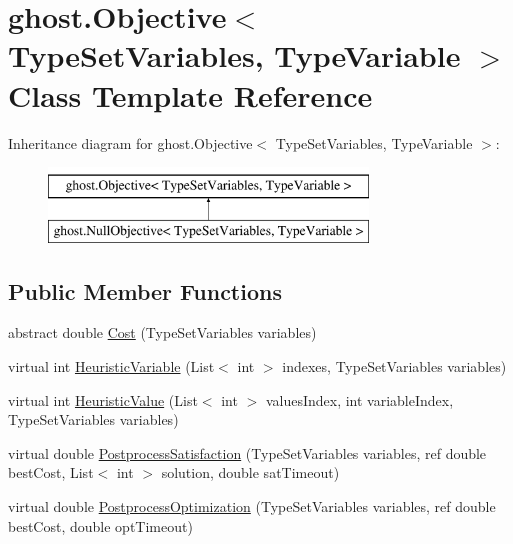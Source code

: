 \hypertarget{classghost_1_1Objective_3_01TypeSetVariables_00_01TypeVariable_01_4}{\section{ghost.\-Objective$<$ Type\-Set\-Variables, Type\-Variable $>$ Class Template Reference}
\label{classghost_1_1Objective_3_01TypeSetVariables_00_01TypeVariable_01_4}
}
Inheritance diagram for ghost.\-Objective$<$ Type\-Set\-Variables, Type\-Variable $>$\-:\begin{figure}[H]
\begin{center}
\leavevmode
\includegraphics[height=2.000000cm]{classghost_1_1Objective_3_01TypeSetVariables_00_01TypeVariable_01_4}
\end{center}
\end{figure}
\subsection*{Public Member Functions}
\begin{DoxyCompactItemize}
\item 
abstract double \hyperlink{classghost_1_1Objective_3_01TypeSetVariables_00_01TypeVariable_01_4_a0c12ac631a5d034441c8192597b018e3}{Cost} (Type\-Set\-Variables variables)
\item 
virtual int \hyperlink{classghost_1_1Objective_3_01TypeSetVariables_00_01TypeVariable_01_4_a64c523482c82c5fcbffa31a0a57aeb48}{Heuristic\-Variable} (List$<$ int $>$ indexes, Type\-Set\-Variables variables)
\item 
virtual int \hyperlink{classghost_1_1Objective_3_01TypeSetVariables_00_01TypeVariable_01_4_ababf3021752413ec655afb785d140627}{Heuristic\-Value} (List$<$ int $>$ values\-Index, int variable\-Index, Type\-Set\-Variables variables)
\item 
virtual double \hyperlink{classghost_1_1Objective_3_01TypeSetVariables_00_01TypeVariable_01_4_acc3900b803f6e1ada95c1e4b5a8f0857}{Postprocess\-Satisfaction} (Type\-Set\-Variables variables, ref double best\-Cost, List$<$ int $>$ solution, double sat\-Timeout)
\item 
virtual double \hyperlink{classghost_1_1Objective_3_01TypeSetVariables_00_01TypeVariable_01_4_a699f37da4873761f4b3c9721f140c56a}{Postprocess\-Optimization} (Type\-Set\-Variables variables, ref double best\-Cost, double opt\-Timeout)
\end{DoxyCompactItemize}
